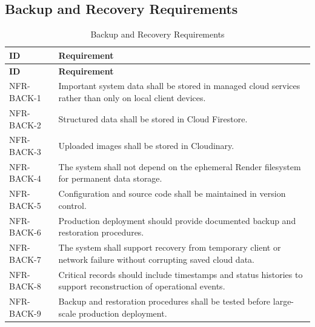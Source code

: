 \subsection{Backup and Recovery Requirements}
\begin{longtable}{@{}p{2.6cm}p{10.8cm}@{}}
\caption{Backup and Recovery Requirements} \label{tab:nfr-back} \\
\toprule \textbf{ID} & \textbf{Requirement} \\ \midrule
\endfirsthead
\toprule \textbf{ID} & \textbf{Requirement} \\ \midrule
\endhead
NFR-BACK-1 & Important system data shall be stored in managed cloud services rather than only on local client devices. \\
NFR-BACK-2 & Structured data shall be stored in Cloud Firestore. \\
NFR-BACK-3 & Uploaded images shall be stored in Cloudinary. \\
NFR-BACK-4 & The system shall not depend on the ephemeral Render filesystem for permanent data storage. \\
NFR-BACK-5 & Configuration and source code shall be maintained in version control. \\
NFR-BACK-6 & Production deployment should provide documented backup and restoration procedures. \\
NFR-BACK-7 & The system shall support recovery from temporary client or network failure without corrupting saved cloud data. \\
NFR-BACK-8 & Critical records should include timestamps and status histories to support reconstruction of operational events. \\
NFR-BACK-9 & Backup and restoration procedures shall be tested before large-scale production deployment. \\
\bottomrule
\end{longtable}

